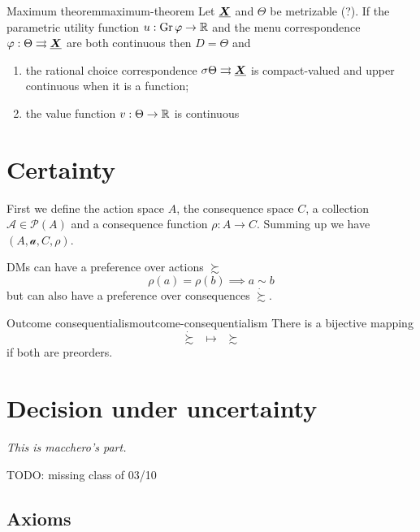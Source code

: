 \documentclass[12pt]{extarticle}
\renewcommand{\vec}[1]{\uvec{#1}}
\newcommand{\Gr}{{\operatorfont Gr} \,}
\begin{document}
\begin{theorem}{Maximum theorem}{maximum-theorem}
    Let $\vec X$ and $\Theta$ be metrizable (?).
    If the parametric utility function $u: \Gr \varphi \to \R$ and the menu correspondence $\varphi: \Theta \rightrightarrows \vec X$ are both continuous then $D = \Theta$ and
    \begin{enumerate}[label=\roman*.]
        \item the rational choice correspondence $\sigma \Theta \rightrightarrows \vec X$ is compact-valued and upper continuous when it is a function;
        \item the value function $v: \Theta \to \mathbb{R}$ is continuous
    \end{enumerate}
\end{theorem}

\section{Certainty}

First we define the action space $A$, the consequence space $C$, a collection $\mathcal A \in \mathcal P(A)$ and a consequence function $\rho: A \to C$.
Summing up we have $(A, \mathcal a, C, \rho)$.

DMs can have a preference over actions $\succsim$
\begin{equation}
    \rho(a) = \rho(b) \implies a \sim b
\end{equation}
but can also have a preference over consequences $\dot \succsim$.

\begin{theorem}{Outcome consequentialism}{outcome-consequentialism}
    There is a bijective mapping
    \begin{equation}
        \dot \succsim \enspace \mapsto \enspace \succsim
    \end{equation}
    if both are preorders.
\end{theorem}

\section{Decision under uncertainty}

\emph{This is macchero's part.}

TODO: missing class of 03/10

\subsection{Axioms}
\end{document}
